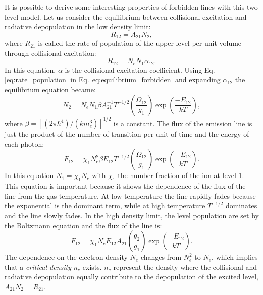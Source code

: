 \documentclass[../thesis.tex]{subfiles}
\begin{document}
It is possible to derive some interesting properties of forbidden lines with this two level model.
Let us consider the equilibrium between collisional excitation and radiative depopulation in the low density limit:
\begin{equation}
    \label{eq:equilibrium_forbidden}
    R_{12} = A_{21}N_2,
\end{equation} 
where $R_{21}$ is called the rate of population of the upper level per unit volume through collisional excitation:
\begin{equation}
    \label{eq:rate_population}
    R_{12} = N_eN_1 \alpha_{12}.
\end{equation}
In this equation, $\alpha$ is the collisional excitation coefficient.
Using Eq.\,\ref{eq:rate_population} in Eq.\,\ref{eq:equilibrium_forbidden} and expanding $\alpha_{12}$ the equilibrium equation became:
\begin{equation}
    \label{eq:equilibrium_forbidden2}
    N_2 = N_e N_1 \beta A_{21}^{-1}T^{-1/2}\left(\frac{\Omega_{12}}{g_1}\right)\exp\left(\frac{-E_{12}}{kT}\right),
\end{equation}
where $\beta = [(2\pi \hbar^4)/(km_e^3)]^{1/2}$ is a constant.
The flux of the emission line is just the product of the number of transition per unit of time and the energy of each photon:
\begin{equation}
    \label{eq:flux}
    F_{12} = \chi_1 N_e^2 \beta E_{12} T^{-1/2} \left(\frac{\Omega_{12}}{g_1}\right) \exp\left(\frac{-E_{12}}{kT}\right).
\end{equation}
In this equation $N_1 = \chi_1N_e$ with $\chi_1$ the number fraction of the ion at level 1.
This equation is important because it shows the dependence of the flux of the line from the gas temperature.
At low temperature the line rapidly fades because the exponential is the dominant term, while at high temperature $T^{-1/2}$ dominates and the line slowly fades.
In the high density limit, the level population are set by the Boltzmann equation and the flux of the line is:
\begin{equation}
    \label{eq:flux_boltz}
    F_{12} = \chi_1 N_e E_{12} A_{21} \left(\frac{g_2}{g_1}\right) \exp\left(\frac{-E_{12}}{kT}\right).
\end{equation}
The dependence on the electron density $N_e$ changes from $N_e^2$ to $N_e$, which implies that a \emph{critical density} $n_c$ exists. 
$n_c$ represent the density where the collisional and radiative depopulation equally contribute to the depopulation of the excited level,  $A_{21} N_2 = R_{21}$.
\end{document}
